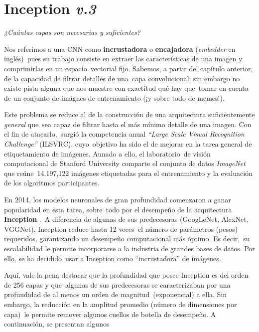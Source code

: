 \section{Inception \emph{v.3}}

\begin{center}
  \emph{¿Cuántas capas son necesarias y suficientes?}
\end{center}\par
\noindent
Nos referimos a una CNN como \textbf{incrustadora} o \textbf{encajadora} (\emph{embedder} en inglés)\
pues su trabajo consiste en extraer las características de una imagen y comprimirlas en un espacio\
vectorial fijo. Sabemos, a partir del capítulo anterior, de la capacidad de filtrar detalles de una\
capa convolucional; sin embargo no existe pista alguna que nos muestre con exactitud qué hay que\
tomar en cuenta de un conjunto de imágnes de entrenamiento (¡y sobre todo de memes!).\par
Este problema se reduce al de la construcción de una arquitectura suficientemente \emph{general} que\
sea capaz de filtrar hasta el más mínimo detalle de una imagen. Con el fin de atacarlo,\
surgió la competencia anual \emph{``Large Scale Visual Recognition Challenge''} (ILSVRC), cuyo\
objetivo ha sido el de mejorar en la tarea general de etiquetamiento de imágenes. Aunado a ello, el laboratorio\
de visión computacional de Stanford University comparte el conjunto de datos \emph{ImageNet} que reúne\
14,197,122 imágenes etiquetadas para el entrenamiento y la evaluación de los algoritmos participantes.\par
En 2014, los modelos neuronales de gran profundidad comenzaron a ganar popularidad en esta tarea, sobre\
todo por el desempeño de la arquitectura \textbf{Inception} \cite{DBLP:journals/corr/SzegedyVISW15}.\
A diferencia de algunas de sus predecesoras (GoogLeNet, AlexNet, VGGNet), Inception reduce hasta 12 veces\
el número de parámetros (pesos) requeridos, garantizando un desempeño computacional más óptimo. Es decir,\
su escalabilidad le permite incorporarse a la industria de grandes bases de datos. Por ello, se ha decidido\
usar a Inception como ``incrustadora'' de imágenes.\par
Aquí, vale la pena destacar que la profundidad que posee Inception es del orden de 256 capas y que\
algunas de sus predecesoras se caracterizaban por una profundidad de al menos un orden de magnitud\
(exponencial) a ella. Sin embargo, la reducción en la amplitud promedio (número de dimensiones por capa)\
le permite remover algunos cuellos de botella de desempeño. A continuación, se presentan algunos\
